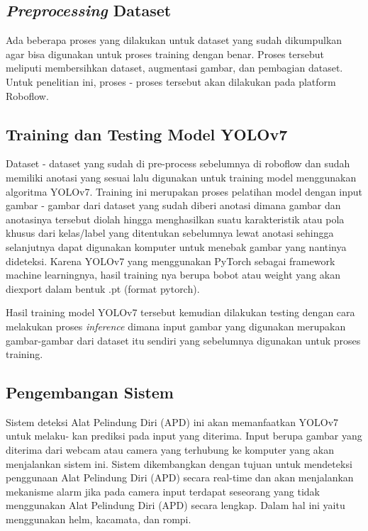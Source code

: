 \subsection{\textit{Preprocessing} Dataset}
\label{sec:preprocessing}
\par Ada beberapa proses yang dilakukan untuk dataset yang sudah dikumpulkan agar bisa digunakan untuk proses training dengan benar. Proses tersebut meliputi membersihkan dataset, augmentasi gambar, dan pembagian dataset. Untuk penelitian ini, proses - proses tersebut akan dilakukan pada platform Roboflow.

\subsection{Training dan Testing Model YOLOv7}
\label{sec:trainingdataset}

\par Dataset - dataset yang sudah di pre-process sebelumnya di roboflow dan sudah memiliki anotasi yang sesuai lalu digunakan untuk training model menggunakan algoritma YOLOv7. Training ini merupakan proses pelatihan model dengan input gambar - gambar dari dataset yang sudah diberi anotasi dimana gambar dan anotasinya tersebut diolah hingga menghasilkan suatu karakteristik atau pola khusus dari kelas/label yang ditentukan sebelumnya lewat anotasi sehingga selanjutnya dapat digunakan komputer untuk menebak gambar yang nantinya dideteksi. Karena YOLOv7 yang menggunakan PyTorch sebagai framework machine learningnya, hasil training nya berupa bobot atau weight yang akan diexport dalam bentuk .pt (format pytorch).

\par Hasil training model YOLOv7 tersebut kemudian dilakukan testing dengan cara melakukan proses \textit{inference} dimana input gambar yang digunakan merupakan gambar-gambar dari dataset itu sendiri yang sebelumnya digunakan untuk proses training.

\subsection{Pengembangan Sistem}
\label{sec:pengembangansistem}

Sistem deteksi Alat Pelindung Diri (APD) ini akan memanfaatkan YOLOv7 untuk melaku- kan prediksi pada input yang diterima. Input berupa gambar yang diterima dari
webcam atau camera yang terhubung ke komputer yang akan menjalankan sistem ini.
Sistem dikembangkan dengan tujuan untuk mendeteksi penggunaan Alat Pelindung Diri (APD) secara real-time dan akan menjalankan mekanisme alarm jika pada camera input
terdapat seseorang yang tidak menggunakan Alat Pelindung Diri (APD) secara lengkap. Dalam hal ini yaitu menggunakan helm, kacamata, dan rompi.

